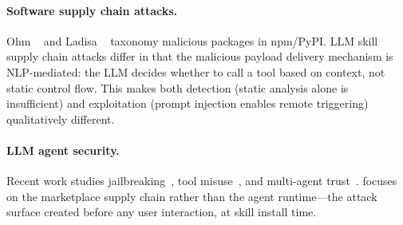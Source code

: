 \paragraph{Software supply chain attacks.}
Ohm \etal~\cite{ohm2020backstabber} and Ladisa \etal~\cite{ladisa2023taxonomy}
taxonomy malicious packages in npm/PyPI.
LLM skill supply chain attacks differ in that the malicious payload
delivery mechanism is NLP-mediated: the LLM decides whether to call
a tool based on context, not static control flow.
This makes both detection (static analysis alone is insufficient)
and exploitation (prompt injection enables remote triggering) qualitatively different.

\paragraph{LLM agent security.}
Recent work studies jailbreaking~\cite{wei2023jailbroken},
tool misuse~\cite{ruan2024identifying},
and multi-agent trust~\cite{ju2024flooding}.
\sysname focuses on the marketplace supply chain rather than
the agent runtime---the attack surface created before any
user interaction, at skill install time.
